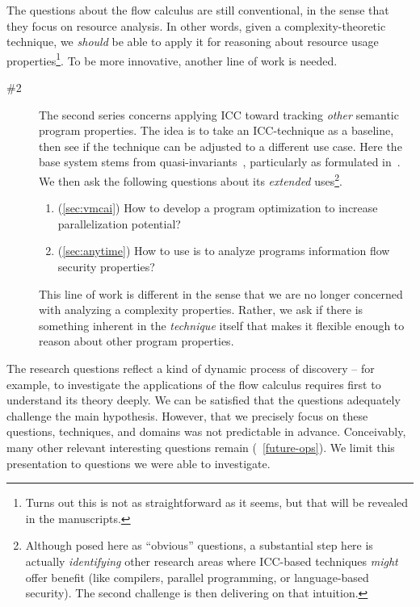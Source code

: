 The questions about the flow calculus are still conventional, in the sense that they focus on resource analysis.
In other words, given a complexity-theoretic technique, we \emph{should} be able to apply it for reasoning about resource usage properties\footnote{
Turns out this is not as straightforward as it seems, but that will be revealed in the manuscripts.}.
To be more innovative, another line of work is needed.

\begin{description}
\item[\#2]
    The second series concerns applying ICC toward tracking \emph{other} semantic program properties.
    The idea is to take an ICC-technique as a baseline, then see if the technique can be adjusted to a different use case.
    Here the base system stems from quasi-invariants~\cite{marion2000}, particularly as formulated in~\textcite{moyen20172}.
    We then ask the following questions about its \emph{extended} uses\footnote{
    Although posed here as \enquote{obvious} questions, a substantial step here is actually \emph{identifying} other research areas where ICC-based techniques \emph{might} offer benefit (like compilers, parallel programming, or language-based security). The second challenge is then delivering on that intuition.}.
    \begin{enumerate}
    \item (\autoref{sec:vmcai}) How to develop a program optimization to increase parallelization potential?
    \item (\autoref{sec:anytime}) How to use is to analyze programs information flow security properties?
    \end{enumerate}
    This line of work is different in the sense that we are no longer concerned with analyzing a complexity properties.
    Rather, we ask if there is something inherent in the \emph{technique} itself that makes it flexible enough to reason about other program properties.

\end{description}

The research questions reflect a kind of dynamic process of discovery --
for example, to investigate the applications of the flow calculus requires first to understand its theory deeply.
We can be satisfied that the questions adequately challenge the main hypothesis.
However, that we precisely focus on these questions, techniques, and domains was not predictable in advance.
Conceivably, many other relevant interesting questions remain (\cf~\autoref{future-ops}).
We limit this presentation to questions we were able to investigate.

